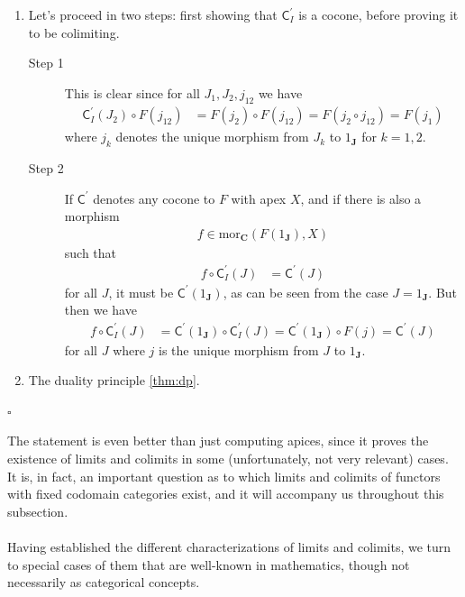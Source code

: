 \begin{prf}
\begin{enumerate}
\item[(1T)]
Let's proceed in two steps: first showing that $\mathsf{C}_{I}^{\prime}$ is a cocone, before proving it to be colimiting.
\begin{description}
\item[Step 1]
This is clear since for all $J_{1},J_{2},j_{12}$ we have
\begin{align*}
  \mathsf{C}_{I}^{\prime}(J_{2})
  \circ
  F(j_{12})
  &=
  F(j_{2})
  \circ
  F(j_{12})
  =
  F(j_{2} \circ j_{12})
  =
  F(j_{1})
\end{align*}
where $j_{k}$ denotes the unique morphism from $J_{k}$ to $1_{\mathbf{J}}$ for $k = 1,2$.
\item[Step 2]
If $\mathsf{C}^{\prime}$ denotes any cocone to $F$ with apex $X$, and if there is also a morphism
\begin{align*}
  f
  \in
  \mathrm{mor}_{\mathbf{C}}
  \left(
    F(1_{\mathbf{J}})
    ,
    X
  \right)
\end{align*}
such that
\begin{align*}
  f
  \circ
  \mathsf{C}_{I}^{\prime}(J)
  &=
  \mathsf{C}^{\prime}(J)
\end{align*}
for all $J$, it must be $\mathsf{C}^{\prime}(1_{\mathbf{J}})$, as can be seen from the case $J = 1_{\mathbf{J}}$.
But then we have
\begin{align*}
  f
  \circ
  \mathsf{C}_{I}^{\prime}(J)
  &=
  \mathsf{C}^{\prime}(1_{\mathbf{J}})
  \circ
  \mathsf{C}_{I}^{\prime}(J)
  =
  \mathsf{C}^{\prime}(1_{\mathbf{J}})
  \circ
  F(j)
  =
  \mathsf{C}^{\prime}(J)
\end{align*}
for all $J$ where $j$ is the unique morphism from $J$ to $1_{\mathbf{J}}$.
\end{description}
\item[(1I)]
The duality principle \ref{thm:dp}.
\end{enumerate}
\phantom{proven}
\hfill
$\square$
\end{prf}
The statement is even better than just computing apices, since it proves the existence of limits and colimits in some (unfortunately, not very relevant) cases.
It is, in fact, an important question as to which limits and colimits of functors with fixed codomain categories exist, and it will accompany us throughout this subsection.
\\\\
Having established the different characterizations of limits and colimits, we turn to special cases of them that are well-known in mathematics, though not necessarily as categorical concepts.
